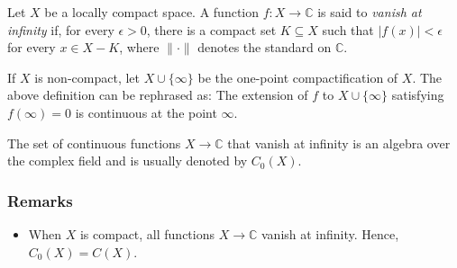\documentclass[12pt]{article}
\begin{document}
Let $X$ be a locally compact space. A function $f:X \longrightarrow \mathbb{C}$ is said to \emph{vanish at infinity} if, for every $\epsilon > 0$, there is a compact set $K \subseteq X$ such that $|f(x)|<\epsilon$ for every $x \in X-K$, where $\|\cdot\|$ denotes the standard  on $\mathbb{C}$. 

If $X$ is non-compact, let $X \cup \{\infty\}$ be the one-point compactification of $X$. The above definition can be rephrased as:  The extension of $f$ to $X \cup \{\infty\}$ satisfying $f(\infty)=0$ is continuous at the point $\infty$.

The set of continuous functions $X \longrightarrow \mathbb{C}$ that vanish at infinity is an algebra over the complex field and is usually denoted by $C_0(X)$.

\subsubsection{Remarks}
\begin{itemize}
\item When $X$ is compact, all functions $X \longrightarrow \mathbb{C}$ vanish at infinity.  Hence, $C_0(X) = C(X)$.
\end{itemize}
\end{document}
